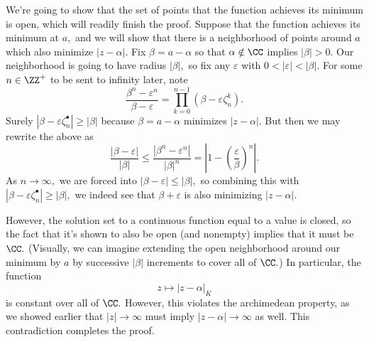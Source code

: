 We're going to show that the set of points that the function achieves its minimum is open, which will readily finish the proof. Suppose that the function achieves its minimum at $a,$ and we will show that there is a neighborhood of points around $a$ which also minimize $|z-\alpha|.$ Fix $\beta=a-\alpha$ so that $\alpha\notin\CC$ implies $|\beta|>0.$ Our neighborhood is going to have radius $|\beta|,$ so fix any $\varepsilon$ with $0<|\varepsilon|<|\beta|.$ For some $n\in\ZZ^+$ to be sent to infinity later, note
\[\frac{\beta^n-\varepsilon^n}{\beta-\varepsilon}=\prod_{k=0}^{n-1}\left(\beta-\varepsilon\zeta_n^k\right).\]
Surely $|\beta-\varepsilon\zeta_n^\bullet|\ge|\beta|$ because $\beta=a-\alpha$ minimizes $|z-\alpha|.$ But then we may rewrite the above as
\[\frac{|\beta-\varepsilon|}{|\beta|}\le\frac{\left|\beta^n-\varepsilon^n\right|}{|\beta|^n}=\left|1-\left(\frac\varepsilon\beta\right)^n\right|.\]
As $n\to\infty,$ we are forced into $|\beta-\varepsilon|\le|\beta|,$ so combining this with $|\beta-\varepsilon\zeta_n^\bullet|\ge|\beta|,$ we indeed see that $\beta+\varepsilon$ is also minimizing $|z-\alpha|.$

However, the solution set to a continuous function equal to a value is closed, so the fact that it's shown to also be open (and nonempty) implies that it must be $\CC.$ (Visually, we can imagine extending the open neighborhood around our minimum by $a$ by successive $|\beta|$ increments to cover all of $\CC.$) In particular, the function
\[z\mapsto|z-\alpha|_K\]
is constant over all of $\CC.$ However, this violates the archimedean property, as we showed earlier that $|z|\to\infty$ must imply $|z-\alpha|\to\infty$ as well. This contradiction completes the proof.

